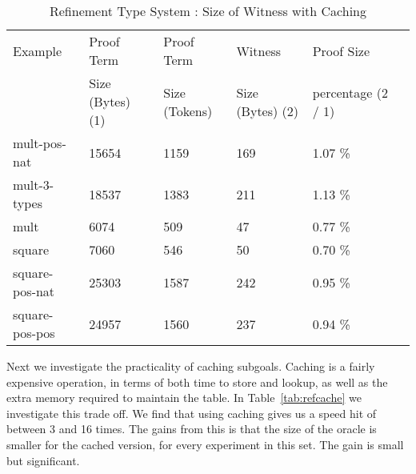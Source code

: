 \documentclass{llncs}
\begin{document}
\begin{table*}[htbp]
\begin{center}
\begin{small}
\begin{tabular}{|l|l|l|l|l|l|}
\hline
Example & Proof Term & Proof Term & Witness & Proof Size\\
& Size (Bytes) (1) & Size (Tokens) & Size (Bytes) (2) & percentage (2 / 1)\\
\hline
mult-pos-nat & 15654 & 1159 & 169 & 1.07 \%\\
mult-3-types & 18537 & 1383 & 211 & 1.13 \%\\
mult & 6074 & 509 & 47 & 0.77 \%\\
square & 7060 & 546 & 50 & 0.70 \%\\
square-pos-nat & 25303 & 1587 & 242 & 0.95 \%\\
square-pos-pos & 24957 & 1560 & 237 & 0.94 \%\\
\hline
\end{tabular}
\end{small}
\end{center}
\caption{\label{tab:refsizes} Refinement Type System : 
Size of Witness with Caching}
\end{table*}

Next we investigate the practicality of caching subgoals. Caching is 
a fairly expensive operation, in terms of both time to store and lookup, 
as well as the extra memory required to maintain the table. In 
Table~\ref{tab:refcache} we investigate this trade off. We find that
using caching gives us a speed hit of between 3 and 16 times. The 
gains from this is that the size of the oracle is smaller for the
cached version, for every experiment in this set. The gain is small
but significant.
\end{document}

